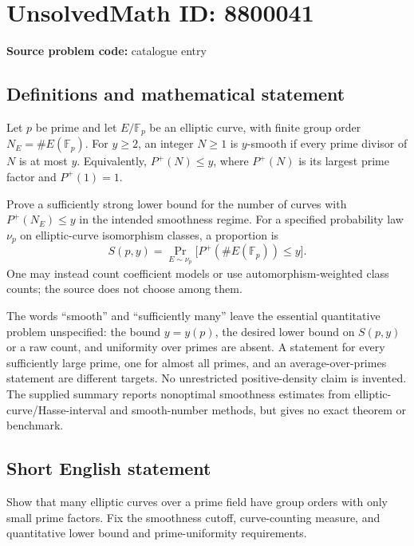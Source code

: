 \documentclass[11pt]{article}
\begin{document}
\section*{UnsolvedMath ID: 8800041}
\textbf{Source problem code:} catalogue entry
\subsection{Definitions and mathematical statement}
Let $p$ be prime and let $E/\mathbb F_p$ be an elliptic curve, with finite group order $N_E=\#E(\mathbb F_p)$. For $y\geq2$, an integer $N\geq1$ is $y$-smooth if every prime divisor of $N$ is at most $y$. Equivalently, $P^+(N)\leq y$, where $P^+(N)$ is its largest prime factor and $P^+(1)=1$.

Prove a sufficiently strong lower bound for the number of curves with $P^+(N_E)\leq y$ in the intended smoothness regime. For a specified probability law $\nu_p$ on elliptic-curve isomorphism classes, a proportion is
\[
S(p,y)=\Pr_{E\sim\nu_p}\bigl[P^+(\#E(\mathbb F_p))\leq y\bigr].
\]
One may instead count coefficient models or use automorphism-weighted class counts; the source does not choose among them.

The words ``smooth'' and ``sufficiently many'' leave the essential quantitative problem unspecified: the bound $y=y(p)$, the desired lower bound on $S(p,y)$ or a raw count, and uniformity over primes are absent. A statement for every sufficiently large prime, one for almost all primes, and an average-over-primes statement are different targets. No unrestricted positive-density claim is invented. The supplied summary reports nonoptimal smoothness estimates from elliptic-curve/Hasse-interval and smooth-number methods, but gives no exact theorem or benchmark.
\subsection{Short English statement}
Show that many elliptic curves over a prime field have group orders with only small prime factors. Fix the smoothness cutoff, curve-counting measure, and quantitative lower bound and prime-uniformity requirements.
\end{document}
